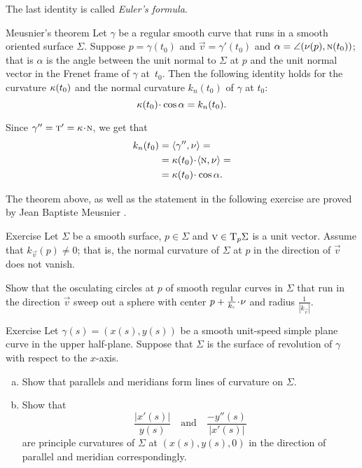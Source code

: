 The last identity is called \emph{Euler's formula}.


\begin{thm}{Meusnier's theorem}\label{thm:meusnier}
Let $\gamma$ be a regular smooth curve that runs in a smooth oriented surface $\Sigma$.
Suppose $p=\gamma(t_0)$ and ${\vec v}=\gamma'(t_0)$ and $\alpha=\angle(\nu(p),\textsc{n}(t_0))$;
that is $\alpha$ is the angle between the unit normal to $\Sigma$ at $p$ and the unit normal vector in the Frenet frame of $\gamma$ at~$t_0$.
Then the following identity holds for the curvature $\kappa(t_0)$ and the normal curvature $k_n(t_0)$ of $\gamma$ at $t_0$:  
\[\kur(t_0)\cdot\cos\alpha=k_{n}(t_0).\]

\end{thm}


 Since $\gamma''=\tan'=\kur\cdot \norm$, we get that
\begin{align*}
k_{n}(t_0)&=\langle\gamma'',\Norm\rangle=
\\
&=\kur(t_0)\cdot\langle\norm,\Norm\rangle=
\\
&=\kur(t_0)\cdot\cos\alpha.
\end{align*}
\qedsf

The theorem above, as well as the statement in the following exercise are proved by Jean Baptiste Meusnier \cite{meusnier}.

\begin{thm}{Exercise}\label{ex:meusnier}
Let $\Sigma$ be a smooth surface, $p\in\Sigma$ and ${\textsc v}\in \mathrm{T}_p\Sigma$ is a unit vector.
Assume that $k_{\vec v}(p)\ne 0$; that is, the normal curvature of $\Sigma$ at $p$ in the direction of ${\vec v}$ does not vanish.

Show that the osculating circles at $p$ of smooth regular curves in $\Sigma$ that run in the direction ${\vec v}$ sweep out a sphere with center $p+\tfrac1{k_{\vec v}}\cdot\Norm$ and radius $\tfrac1{|k_{\vec v}|}$.
\end{thm}

\begin{thm}{Exercise}\label{ex:principle-revolution}
Let $\gamma(s)=(x(s),y(s))$ be a smooth unit-speed simple plane curve in the upper half-plane.
Suppose that $\Sigma$ is the surface of revolution of $\gamma$ with respect to the $x$-axis.

\begin{enumerate}[(a)]
\item Show that parallels and meridians form lines of curvature on $\Sigma$.
\item Show that 
\[\frac{|x'(s)|}{y(s)}
\quad
\text{and}
\quad
\frac{-y''(s)}{|x'(s)|}
\]
are principle curvatures of $\Sigma$ at $(x(s),y(s),0)$ in the direction of parallel and meridian correspondingly.
\end{enumerate}

\end{thm}

